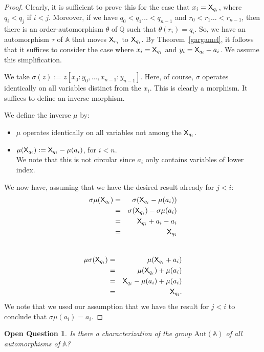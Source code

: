 \documentclass{amsart}
\newcommand{\qee} {\hspace*{2mm}\hfill \ding{109}}
\newtheorem{ques}[theorem]{Open Question}
\newenvironment{question}{\begin{ques} \rm}{\qee\end{ques}}
\newcommand{\X}{{\sf X}}
\begin{document}
\begin{proof}
Clearly, it is sufficient to prove this for the case that $x_i = \X_{q_i}$, where $q_i<q_j$ if $i<j$. 
Moreover, if we have $q_0 < q_1 \dots < q_{n-1}$ and $r_0 < r_1 \dots < r_{n-1}$, then there is
an order-automorphism $\theta$ of $\mathbb Q$ such that $\theta(r_i)=q_i$. 
So, we have an automorphism $\tau$ of $\mathbb A$ that moves $\X_{r_i}$ to $\X_{q_i}$.
By Theorem~\ref{gargamel}, it follows that it suffices to consider the case where $x_i= \X_{q_i}$ and $y_i = \X_{q_i}+a_i$.
We assume this simplification.

We take $\sigma(z) := z[x_0:y_0,\dots,x_{n-1}:y_{n-1}]$. Here, of course, $\sigma$ operates identically on all 
variables distinct from the $x_i$. This is clearly a morphism. It suffices to define
an inverse morphism.

We define the inverse  $\mu$ by:
\begin{itemize}
\item
$\mu$ operates identically on all variables not among the $\X_{q_i}$.
\item
$\mu(\X_{q_i}) := \X_{q_i} - \mu(a_i)$, for $i<n$.\\
We note that this is not circular since $a_i$ only contains
variables of lower index.
\end{itemize}
 We now have, assuming that we have the desired result already for $j<i$:
 \begin{eqnarray*}
 \sigma\mu (\X_{q_i}) & = &  \sigma(\X_{q_i} - \mu(a_i)) \\
 & = & \sigma(\X_{q_i}) - \sigma\mu(a_i) \\
 & = & \X_{q_i}+a_i -a_i \\
 &= & \X_{q_i}
 \end{eqnarray*}
  \\
 \begin{eqnarray*}
  \mu\sigma (\X_{q_i}) & = &  \mu(\X_{q_i} + a_i) \\
  & = & \mu (\X_{q_i}) + \mu(a_i) \\
  & = & \X_{q_i}-\mu(a_i)+\mu(a_i) \\
  & = & \X_{q_i}.
 \end{eqnarray*}
 We note that we used our assumption that we have the result for $j<i$ to conclude  that $\sigma\mu(a_i) = a_i$.
\end{proof}

\begin{question}\label{Question_Aut(A)}
    Is there a characterization of the group $\mathrm{Aut}(\mathbb{A})$ of all automorphisms of $\mathbb{A}$?
\end{question}
\end{document}
